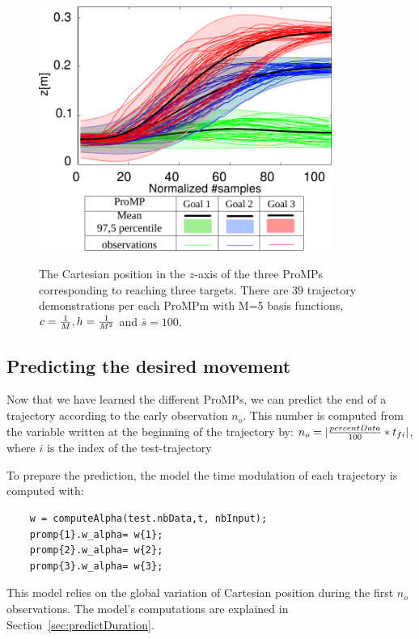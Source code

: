 \documentclass[utf8]{frontiersSCNS} %
\begin{document}
\begin{figure}[h]
\centering
{
\includegraphics[height=8cm]{img/3DOFtrajectoriesProMPs.pdf}
}
\caption{The Cartesian position in the $z$-axis of the three ProMPs corresponding to reaching three targets. There are $39$ trajectory demonstrations per each ProMPm with M=5 basis functions, $c={1 \over M}, h={1 \over M^2}$ and $\bar{s} = 100$.}
\label{fig:3TargetsZTrajectoriesProMP}
\end{figure}


\subsection{Predicting the desired movement}

Now that we have learned the different ProMPs, we can predict the end of a trajectory according to the early observation $n_o$.
This number is computed from the variable  written at the beginning of the trajectory by: $n_o= |{percentData \over 100}* t_{fi}|$, where $i$ is the index of the test-trajectory

To prepare the prediction, the model the time modulation of each trajectory is computed with:
\begin{lstlisting}
    w = computeAlpha(test.nbData,t, nbInput);
    promp{1}.w_alpha= w{1};
    promp{2}.w_alpha= w{2};
    promp{3}.w_alpha= w{3};
\end{lstlisting}
This model relies on the global variation of Cartesian position during the first $n_o$ observations. The model's computations are explained in Section~\ref{sec:predictDuration}.
\end{document}
